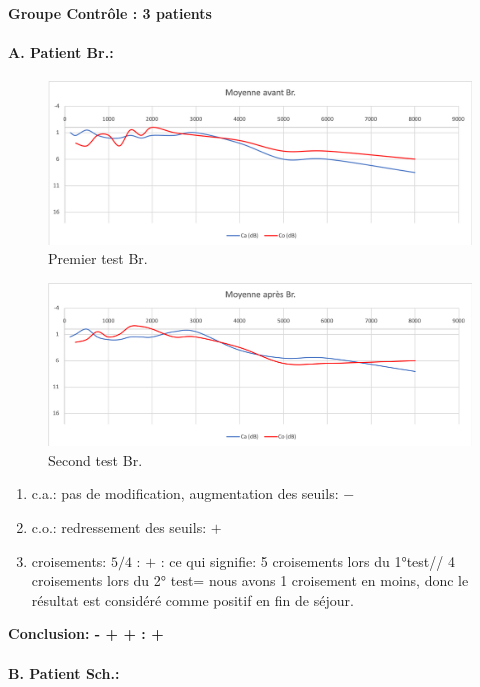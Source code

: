       \textbf{Groupe Contrôle : 3 patients}
  \paragraph{ A. Patient Br.:}
  \begin{figure}[ht]
\centering
\includegraphics[width=0.7\linewidth]{images/graphiques/bru_pre.png}
\caption[Moyenne OG+OD]{Premier test Br.}

\end{figure}



 \begin{figure}[th]
\centering
\includegraphics[width=0.7\linewidth]{images/graphiques/bru_post.png}
\caption[Moyenne OG+OD]{Second test Br.}

\end{figure}

	\begin{enumerate}
 		\item  c.a.: pas de modification, augmentation des
                  seuils: $-$
 		\item  c.o.: redressement des seuils: $+$
 		\item  croisements: $5/4$ : $+$ : ce qui signifie:  5 croisements lors du 1°test// 4 croisements lors du 2° test= nous avons 1 croisement en moins, donc le résultat est considéré comme positif en fin
                  de séjour.
                \end{enumerate}

                \textbf{  Conclusion:  -    +    +       :  +}




\paragraph{B. Patient Sch.:}

